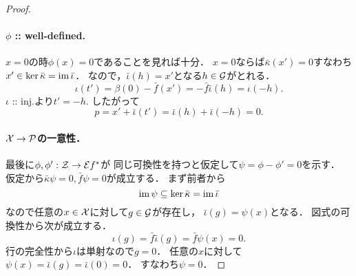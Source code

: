 \documentclass[a4paper]{jsarticle}
\begin{document}
\begin{proof}
        \paragraph{$\phi$ :: well-defined.}
        $x=0$の時$\phi(x)=0$であることを見れば十分．
        $x=0$ならば$\bar{\kappa}(x')=0$すなわち
        $x' \in \ker \bar{\kappa}=\operatorname{im} \bar{\iota}$．
        なので，$\bar{\iota}(h)=x'$となる$h \in \mathcal{G}$がとれる．
        \[ \iota(t')=\beta(0)-\bar{f}(x')=-\bar{f}\bar{\iota}(h)=\iota(-h). \]
        $\iota$ :: inj.より$t'=-h$.
        したがって
        \[ p=x'+\bar{\iota}(t')=\bar{\iota}(h)+\bar{\iota}(-h)=0. \]

        \paragraph{$\mathcal{X} \to \mathcal{P}$の一意性．}
        最後に$\phi, \phi': \mathcal{Z} \to \mathcal{E} f^*$が
        同じ可換性を持つと仮定して$\psi=\phi-\phi'=0$を示す．
        仮定から$\bar{\kappa} \psi=0, \bar{f}\psi=0$が成立する．
        まず前者から
        \[ \operatorname{im} \psi \subseteq \ker \bar{\kappa}=\operatorname{im} \bar{\iota} \]
        なので任意の$x \in \mathcal{X}$に対して$g \in \mathcal{G}$が存在し，
        $\bar{\iota}(g)=\psi(x)$となる．
        図式の可換性から次が成立する．
        \[ \iota(g)=\bar{f}\bar{\iota}(g)=\bar{f}\psi(x)=0. \]
        行の完全性から$\iota$は単射なので$g=0$．
        任意の$x$に対して$\psi(x)=\bar{\iota}(g)=\bar{\iota}(0)=0$．
        すなわち$\psi=0$．
    \end{proof}
\end{document}
